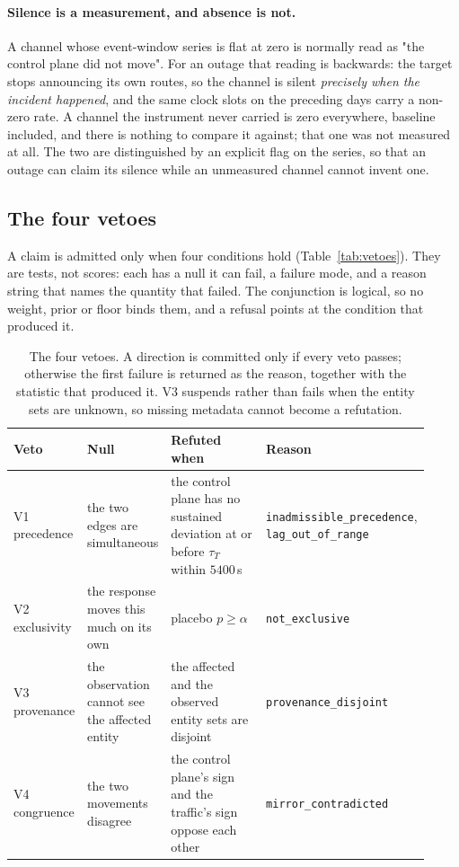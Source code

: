 \paragraph{Silence is a measurement, and absence is not.} A channel whose
event-window series is flat at zero is normally read as "the control
plane did not move". For an outage that reading is backwards: the target
stops announcing its own routes, so the channel is silent \emph{precisely
when the incident happened}, and the same clock slots on the preceding
days carry a non-zero rate. A channel the instrument never carried is
zero everywhere, baseline included, and there is nothing to compare it
against; that one was not measured at all. The two are distinguished by
an explicit flag on the series, so that an outage can claim its silence
while an unmeasured channel cannot invent one.

\subsection{The four vetoes}
\label{sec:method-vetoes}
\label{sec:method-channels}

A claim is admitted only when four conditions hold
(Table~\ref{tab:vetoes}). They are tests, not scores: each has a null it
can fail, a failure mode, and a reason string that names the quantity that
failed. The conjunction is logical, so no weight, prior or floor binds
them, and a refusal points at the condition that produced it.

\begin{table}[t]
\centering
\caption{The four vetoes. A direction is committed only if every veto
passes; otherwise the first failure is returned as the reason, together
with the statistic that produced it. V3 suspends rather than fails when
the entity sets are unknown, so missing metadata cannot become a
refutation.}
\label{tab:vetoes}
\label{tab:channels}
\footnotesize
\begin{tabular}{@{}p{0.10\linewidth}p{0.20\linewidth}p{0.38\linewidth}p{0.24\linewidth}@{}}
\hline
\textbf{Veto} & \textbf{Null} & \textbf{Refuted when} & \textbf{Reason} \\
\hline
V1 precedence & the two edges are simultaneous & the control plane has
  no sustained deviation at or before $\tau_T$ within $5400$\,s &
  \texttt{inadmissible\_precedence}, \texttt{lag\_out\_of\_range} \\
V2 exclusivity & the response moves this much on its own & placebo
  $p\ge\alpha$ & \texttt{not\_exclusive} \\
V3 provenance & the observation cannot see the affected entity & the
  affected and the observed entity sets are disjoint &
  \texttt{provenance\_disjoint} \\
V4 congruence & the two movements disagree & the control plane's sign
  and the traffic's sign oppose each other &
  \texttt{mirror\_contradicted} \\
\hline
\end{tabular}
\end{table}

